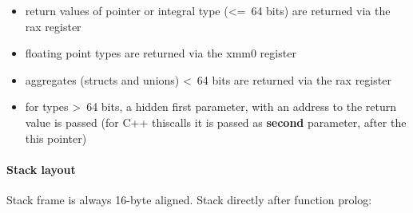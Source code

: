 \begin{itemize}
\item return values of pointer or integral type (\textless=\ 64 bits) are returned via the rax register
\item floating point types are returned via the xmm0 register
\item aggregates (structs and unions) \textless\ 64 bits are returned via the rax register
\item for types \textgreater\ 64 bits, a hidden first parameter, with an address to the return value is passed (for C++ thiscalls it is passed as {\bf second} parameter, after the this pointer)
\end{itemize}


\paragraph{Stack layout}

Stack frame is always 16-byte aligned.
Stack directly after function prolog:\\

